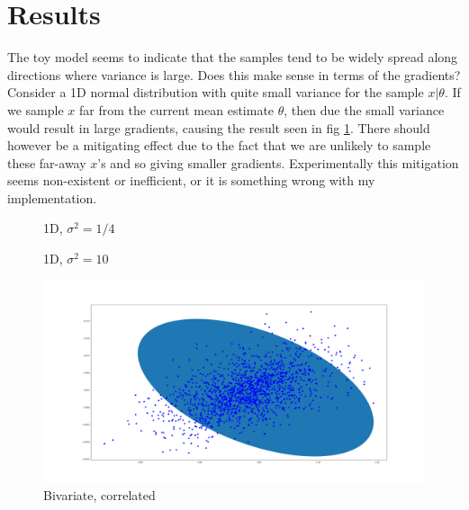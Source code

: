 \section{Results}

The toy model seems to indicate that the samples tend to be widely spread along directions where variance is large.
Does this make sense in terms of the gradients?
Consider a 1D normal distribution with quite small variance for the sample $x| \theta$.
If we sample $x$ far from the current mean estimate $\theta$, then due the small variance would result in large gradients, causing the result seen in fig \ref{fig:1d_low_var}. There should however be a mitigating effect due to the fact that we are unlikely to sample these far-away $x$'s and so giving smaller gradients. Experimentally this mitigation seems non-existent or inefficient, or it is something wrong with my implementation.  

\begin{figure}
\centering
  
  \caption{1D, $\sigma^2 = 1/4$}\label{fig:1d_low_var}
\end{figure}

\begin{figure}
\centering
  
  \caption{1D, $\sigma^2 = 10$}\label{fig:1d_high_var}
\end{figure}



\begin{figure}
\centering
  \includegraphics[width=\linewidth]{fig/mirrored_cov_1.png}
  \caption{Bivariate, correlated}\label{fig:mirrored_cov_1}
\end{figure}
